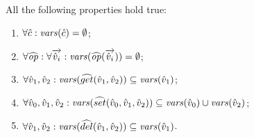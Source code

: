 \begin{assumption}[Variables]
\label{asm:variables}
All the following properties hold true:
\begin{enumerate}
\item $\forall \hat{c}: \mathit{vars}(\hat{c}) = \emptyset$;
\item $\forall \widehat{\mathit{op}}: \forall \overrightarrow{\hat{v}_i}: \mathit{vars}(\widehat{\mathit{op}}(\overrightarrow{\hat{v}_i})) = \emptyset$;
\item $\forall \hat{v}_1,\hat{v}_2: \mathit{vars}(\widehat{get}(\hat{v}_1,\hat{v}_2)) \subseteq \mathit{vars}(\hat{v}_1)$;
\item $\forall \hat{v}_0,\hat{v}_1,\hat{v}_2: \mathit{vars}(\widehat{set}(\hat{v}_0,\hat{v}_1,\hat{v}_2)) \subseteq \mathit{vars}(\hat{v}_0) \cup \mathit{vars}(\hat{v}_2)$;
\item $\forall \hat{v}_1,\hat{v}_2: \mathit{vars}(\widehat{del}(\hat{v}_1,\hat{v}_2)) \subseteq \mathit{vars}(\hat{v}_1)$.
\end{enumerate}
\end{assumption}
